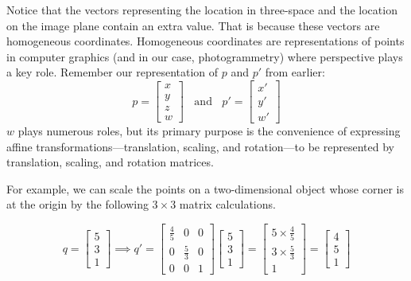 \documentclass[
    12pt,
    twoside,
    bibstyle=chicago,
    headerstyle=uppercase,
	bibfile=biblatex_updating.bib
]{reedthesis}
\begin{document}
Notice that the vectors representing the location in three-space and the location on the image plane contain an extra value. That is because these vectors are homogeneous coordinates. Homogeneous coordinates are representations of points in computer graphics (and in our case, photogrammetry) where perspective plays a key role. Remember our representation of $p$ and $p'$ from earlier: \[p = \left[\begin{smallmatrix}x\\y\\z\\w\end{smallmatrix}\right]\;\; \text{ and }\;\; p' = \left[\begin{smallmatrix}x'\\y'\\w'\end{smallmatrix}\right]\] $w$ plays numerous roles, but its primary purpose is the convenience of expressing affine transformations---translation, scaling, and rotation---to be represented by translation, scaling, and rotation matrices.


For example, we can scale the points on a two-dimensional object whose corner is at the origin by the following $3\times3$ matrix calculations.

\[q = \begin{bmatrix}5\\3\\1\end{bmatrix} \implies q' = \begin{bmatrix}\frac{4}{5}&0&0\\0&\frac{5}{3}&0\\0&0&1\end{bmatrix}\begin{bmatrix}5\\3\\1\end{bmatrix} = \begin{bmatrix}5 \times \frac{4}{5}\\3 \times \frac{5}{3}\\1\end{bmatrix}= \begin{bmatrix}4\\5\\1\end{bmatrix}\]
\end{document}

